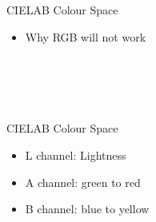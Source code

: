 \documentclass[12pt]{beamer}
\begin{document}
\begin{frame}{CIELAB Colour Space}
	\begin{itemize}
		\item Why RGB will not work\\~
	\end{itemize}
\end{frame}

\begin{frame}[standout]
	\begin{columns}
		\begin{column}{0.5\textwidth}
			\\
		\end{column}
		\begin{column}{0.5\textwidth}
			\\
		\end{column}
	\end{columns}
	\pause
	\vspace{5 mm}
\end{frame}

{
	\begin{frame}
	\end{frame}
}

\begin{frame}{CIELAB Colour Space}
	\begin{itemize}
		\item L channel: Lightness
		\item A channel: green to red
		\item B channel: blue to yellow
	\end{itemize}
\end{frame}
\end{document}
